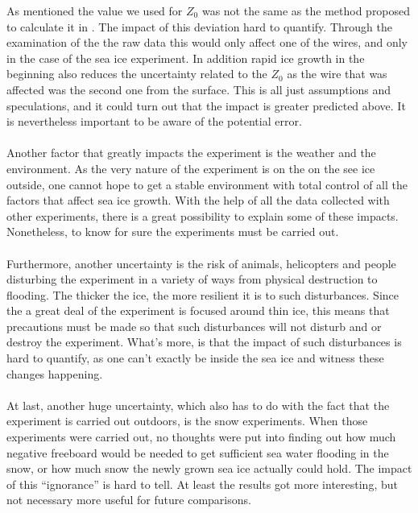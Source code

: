 As mentioned the value we used for $Z_0$ was not the same as the method proposed to calculate it in \textcite{Fuchs}. The impact of this deviation hard to quantify. Through the examination of the the raw data this would only affect one of the wires, and only in the case of the sea ice experiment. In addition rapid ice growth in the beginning also reduces the uncertainty related to the $Z_0$ as the wire that was affected was the second one from the surface. This is all just assumptions and speculations, and it could turn out that the impact is greater predicted above. It is nevertheless important to be aware of the potential error.\\
\\
Another factor that greatly impacts the experiment is the weather and the environment. As the very nature of the experiment is on the on the see ice outside, one cannot hope to get a stable environment with total control of all the factors that affect sea ice growth. With the help of all the data collected with other experiments, there is a great possibility to explain some of these impacts. Nonetheless, to know for sure the experiments must be carried out.\\
\\
Furthermore, another uncertainty is the risk of animals, helicopters and people disturbing the experiment in a variety of ways from physical destruction to flooding. The thicker the ice, the more resilient it is to such disturbances. Since the a great deal of the experiment is focused around thin ice, this means that precautions must be made so that such disturbances will not disturb and or destroy the experiment.
What's more, is that the impact of such disturbances is hard to quantify, as one can't exactly be inside the sea ice and witness these changes happening.\\
\\
At last, another huge uncertainty, which also has to do with the fact that the experiment is carried out outdoors, is the snow experiments. When those experiments were carried out, no thoughts were put into finding out how much negative freeboard would be needed to get sufficient sea water flooding in the snow, or how much snow the newly grown sea ice actually could hold. The impact of this \enquote{ignorance} is hard to tell. At least the results got more interesting, but not necessary more useful for future comparisons. 


